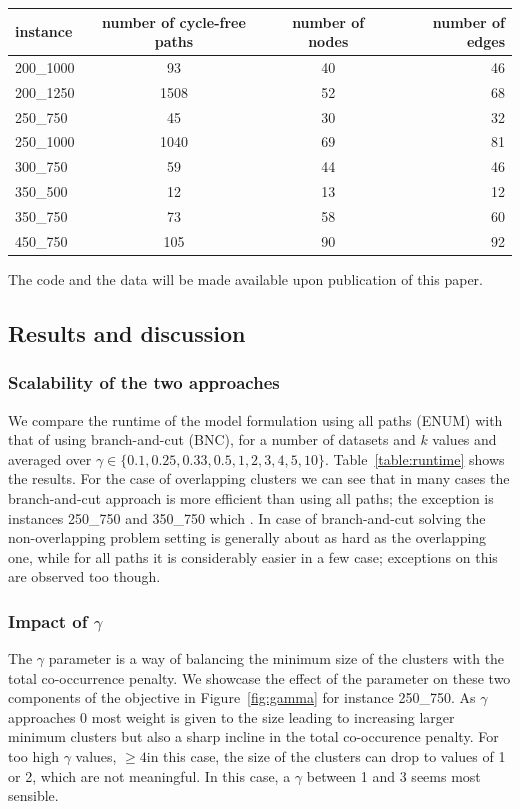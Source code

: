 \documentclass[conference]{IEEEtran}
\newcommand{\NDT}[1]{\todo[bordercolor=ghue,linecolor=ghue,color=ghue!40]{Tias: #1}}
\begin{document}
\begin{table}
\centering
\captionsetup{font=small}
\label{table:instanceInformation}
\begin{tabular}{|l c c r|}
\hline
instance & number of cycle-free paths & number of nodes & number of edges\\
\hline
200\_1000 & 93 & 40 & 46\\
200\_1250 & 1508 & 52 & 68\\
250\_750 & 45 & 30 & 32\\
250\_1000 & 1040 & 69 & 81\\
300\_750 & 59 & 44 & 46\\
350\_500 & 12 & 13 & 12\\
350\_750 & 73 & 58 & 60\\
450\_750 & 105 & 90 & 92\\
\hline
\end{tabular}
\end{table}


The code and the data will be made available upon publication of this paper.

\subsection{Results and discussion}
\subsubsection{Scalability of the two approaches}
We compare the runtime of the model formulation using all paths (ENUM) with that of using branch-and-cut (BNC), for a number of datasets and $k$ values and averaged over $\gamma\in\{0.1,0.25,0.33,0.5,1,2,3,4,5,10\}$. Table~\ref{table:runtime} shows the results. For the case of overlapping clusters we can see that in many cases the branch-and-cut approach is more efficient than using all paths; the exception is instances 250\_750 and 350\_750 which \NDT{TODO: explanation}. In case of branch-and-cut solving the non-overlapping problem setting is generally about as hard as the overlapping one, while for all paths it is considerably easier in a few case; exceptions on this are observed too though.

\subsubsection{Impact of $\gamma$}
The $\gamma$ parameter is a way of balancing the minimum size of the clusters with the total co-occurrence penalty. We showcase the effect of the parameter on these two components of the objective in Figure~\ref{fig:gamma} for instance 250\_750. As $\gamma$ approaches $0$ most weight is given to the size leading to increasing larger minimum clusters but also a sharp incline in the total co-occurence penalty. For too high $\gamma$ values, $\geq 4$in this case, the size of the clusters can drop to values of 1 or 2, which are not meaningful. In this case, a $\gamma$ between 1 and 3 seems most sensible.
\end{document}
